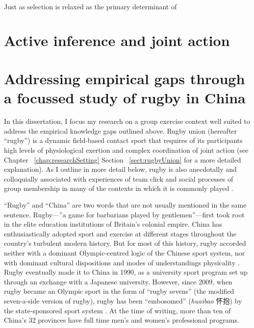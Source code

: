 \begin{CJK}{UTF8}{gbsn}
Just as selection is relaxed as the primary determinant of


\section{Active inference and joint action}



\section{Addressing empirical gaps through a focussed study of rugby in China}

In this dissertation, I focus my research on a group exercise context well suited to address the empirical knowledge gaps outlined above.  Rugby union (hereafter ``rugby'') is a dynamic field-based contact sport that requires of its participants high levels of physiological exertion and complex coordination of joint action (see Chapter ~\ref{chap:researchSetting} Section ~\ref{sect:rugbyUnion} for a more detailed explanation). As I outline in more detail below, rugby is also anecdotally and colloquially associated with experiences of team click and social processes of group membership in many of the contexts in which it is commonly played \citep{Dunning2005}.

``Rugby'' and ``China'' are two words that are not usually mentioned in the same sentence.  Rugby---''a game for barbarians played by gentlemen''---first took root in the elite education institutions of Britain's colonial empire.  China has enthusiastically adopted sport and exercise at different stages throughout the country's turbulent modern history. But for most of this history, rugby accorded neither with a dominant Olympic-centred logic of the Chinese sport system, nor with dominant cultural dispositions and modes of understandings physicality \citep[derived from hundresds of years of continuous history of Confucian and Daoist traditions of thought, see][]{Morris2004}.  Rugby eventually made it to China in 1990, as a university sport program set up through an exchange with a Japanese university.  However, since 2009, when rugby became an Olympic sport in the form of ``rugby sevens'' (the modified seven-a-side version of rugby), rugby has been ``embosomed'' (\textit{huaibao} 怀抱) by the state-sponsored sport system \citep{Xu2010}.  At the time of writing, more than ten of China's 32 provinces have full time men's and women's professional programs.


\end{CJK}
